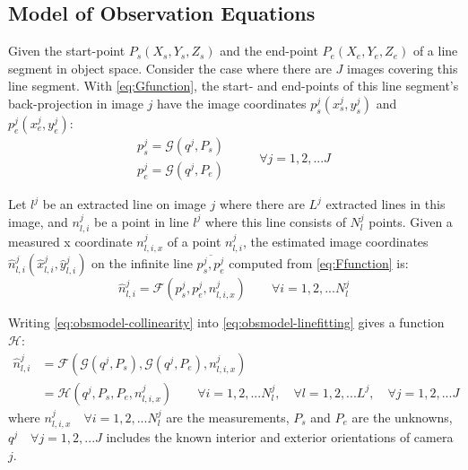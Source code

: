 

\subsection{Model of Observation Equations}
\label{subsec:ObsEqua}

Given the start-point $P_s(X_s,Y_s,Z_s)$ and the end-point $P_e(X_e,Y_e,Z_e)$ of a line segment in object space. Consider the case where there are $J$ images covering this line segment. With \cref{eq:Gfunction}, the start- and end-points of this line segment's back-projection in image $j$ have the image coordinates $p^j_s(x^j_s,y^j_s)$ and $p^j_e(x^j_e,y^j_e)$:
\begin{equation} \label{eq:obsmodel-collinearity}
\begin{split}
p^j_s = \mathcal{G}(q^j,P_s)\\
p^j_e = \mathcal{G}(q^j,P_e)
\end{split}
\qquad
\begin{split}
\forall j=1,2,...J
\end{split}
\end{equation}

Let $l^j$ be an extracted line on image $j$ where there are $L^j$ extracted lines in this image, and $n^j_{l,i}$ be a point in line $l^j$ where this line consists of $N^j_l$ points. Given a measured x coordinate $n^j_{l,i,x}$ of a point $n^j_{l,i}$, the estimated image coordinates $\hat{n}^j_{l,i}(\hat{x}^j_{l,i},\hat{y}^j_{l,i})$ on the infinite line $\overline{p^j_s,p^j_e}$ computed from \cref{eq:Ffunction} is:
\begin{equation} \label{eq:obsmodel-linefitting}
\hat{n}^j_{l,i} = \mathcal{F}(p^j_s,p^j_e,n^j_{l,i,x})
\qquad
\forall i=1,2,...N^j_l
\end{equation}

Writing \eqref{eq:obsmodel-collinearity} into \eqref{eq:obsmodel-linefitting} gives a function $\mathcal{H}$:
\begin{equation} \label{eq:obsmodel}
\begin{split}
\hat{n}^j_{l,i} &= \mathcal{F}(\mathcal{G}(q^j,P_s),\mathcal{G}(q^j,P_e),n^j_{l,i,x})\\
&=\mathcal{H}(q^j,P_s,P_e,n^j_{l,i,x})
\qquad
\forall i=1,2,...N^j_l,\quad\forall l=1,2,...L^j,\quad\forall j=1,2,...J
\end{split}
\end{equation}
where $n^j_{l,i,x}\quad\forall i=1,2,...N^j_l$ are the measurements, $P_s$ and $P_e$ are the unknowns, $q^j\quad\forall j=1,2,...J$ includes the known interior and exterior orientations of camera $j$.\newline

